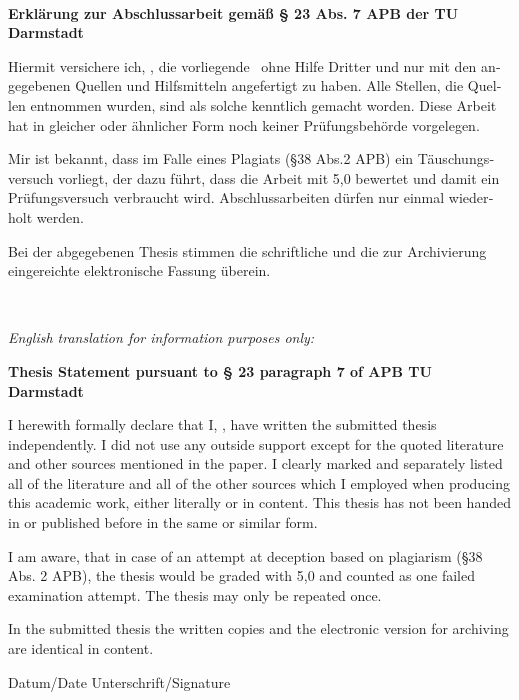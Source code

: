\documentclass[ma_haettasch_ontology_refining.tex]{subfiles}
\begin{document}
\begin{large}
\begin{otherlanguage}{ngerman}
\begin{center}
~

\textbf{Erklärung zur Abschlussarbeit gemäß § 23 Abs. 7 APB der TU Darmstadt}
\end{center}

Hiermit versichere ich, \statementAuthor, die vorliegende \thesisKind~ohne Hilfe Dritter und nur mit den angegebenen Quellen und Hilfsmitteln angefertigt zu haben. Alle Stellen, die Quellen entnommen wurden, sind als solche kenntlich gemacht worden. Diese Arbeit hat in gleicher oder ähnlicher Form noch keiner Prüfungsbehörde vorgelegen. 

Mir ist bekannt, dass im Falle eines Plagiats (§38 Abs.2 APB) ein Täuschungsversuch vorliegt, der dazu führt, dass die Arbeit mit 5,0 bewertet und damit ein Prüfungsversuch verbraucht wird. Abschlussarbeiten dürfen nur einmal wiederholt werden.

Bei der abgegebenen Thesis stimmen die schriftliche und die zur Archivierung eingereichte elektronische Fassung überein.
\end{otherlanguage}

~\hrulefill~


\begin{center}
\textit{English translation for information purposes only:}

\textbf{Thesis Statement pursuant to § 23 paragraph 7 of APB TU Darmstadt}
\end{center}

I herewith formally declare that I, \statementAuthor, have written the submitted thesis independently. I did not use any outside support except for the quoted literature and other sources mentioned in the paper. I clearly marked and separately listed all of the literature and all of the other sources which I employed when producing this academic work, either literally or in content. This thesis has not been handed in or published before in the same or similar form.

I am aware, that in case of an attempt at deception based on plagiarism (§38 Abs. 2 APB), the thesis would be graded with 5,0 and counted as one failed examination attempt. The thesis may only be repeated once.

In the submitted thesis the written copies and the electronic version for archiving are identical in content.


\vspace*{3cm}
{\small{Datum/Date \hspace*{3cm} Unterschrift/Signature}}

\end{large}
\end{document}
